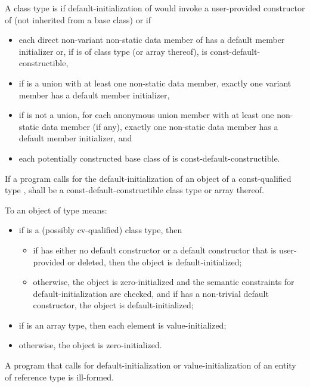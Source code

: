 A class type  is  if
default-initialization of  would invoke
a user-provided constructor of  (not inherited from a base class)
or if
\begin{itemize}
\item
each direct non-variant non-static data member  of 
has a default member initializer
or, if  is of class type  (or array thereof),
 is const-default-constructible,
\item
if  is a union with at least one non-static data member,
exactly one variant member has a default member initializer,
\item
if  is not a union,
for each anonymous union member with at least one non-static data member (if any),
exactly one non-static data member has a default member initializer, and
\item
each potentially constructed base class of  is const-default-constructible.
\end{itemize}

If a program calls for the default-initialization of an object of a
const-qualified type ,
 shall be a const-default-constructible class type or array thereof.

\pnum
To
an object of type
means:
\begin{itemize}
\item
if
is a (possibly cv-qualified) class type, then
\begin{itemize}
\item
if  has
either no default constructor or a default
constructor that is user-provided or deleted, then the object is default-initialized;
\item
otherwise,
the object is zero-initialized and the semantic constraints for
default-initialization are checked, and if  has a
non-trivial default constructor, the object is default-initialized;
\end{itemize}
\item
if
is an array type, then each element is value-initialized;

\item
otherwise, the object is zero-initialized.
\end{itemize}

\pnum
A program that calls for default-initialization
or value-initialization
of an entity
of reference type is ill-formed.

